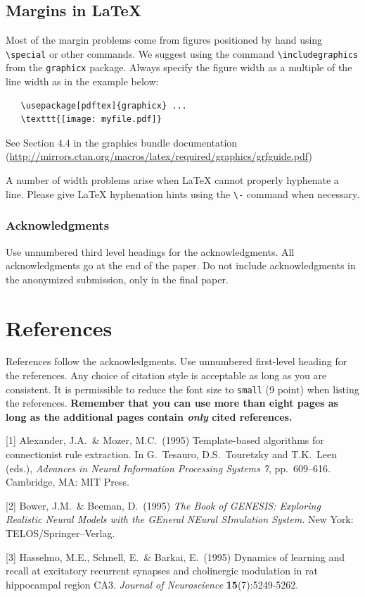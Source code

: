 \documentclass{article}
\begin{document}
\subsection{Margins in \LaTeX{}}

Most of the margin problems come from figures positioned by hand using
\verb+\special+ or other commands. We suggest using the command
\verb+\includegraphics+ from the \verb+graphicx+ package. Always specify the
figure width as a multiple of the line width as in the example below:
\begin{verbatim}
   \usepackage[pdftex]{graphicx} ...
   \texttt{[image: myfile.pdf]}
\end{verbatim}
See Section 4.4 in the graphics bundle documentation
(\url{http://mirrors.ctan.org/macros/latex/required/graphics/grfguide.pdf})

A number of width problems arise when \LaTeX{} cannot properly hyphenate a
line. Please give LaTeX hyphenation hints using the \verb+\-+ command when
necessary.

\subsubsection*{Acknowledgments}

Use unnumbered third level headings for the acknowledgments. All acknowledgments
go at the end of the paper. Do not include acknowledgments in the anonymized
submission, only in the final paper.

\section*{References}

References follow the acknowledgments. Use unnumbered first-level heading for
the references. Any choice of citation style is acceptable as long as you are
consistent. It is permissible to reduce the font size to \verb+small+ (9 point)
when listing the references. {\bf Remember that you can use more than eight
  pages as long as the additional pages contain \emph{only} cited references.}
\medskip

\small

[1] Alexander, J.A.\ \& Mozer, M.C.\ (1995) Template-based algorithms for
connectionist rule extraction. In G.\ Tesauro, D.S.\ Touretzky and T.K.\ Leen
(eds.), {\it Advances in Neural Information Processing Systems 7},
pp.\ 609--616. Cambridge, MA: MIT Press.

[2] Bower, J.M.\ \& Beeman, D.\ (1995) {\it The Book of GENESIS: Exploring
  Realistic Neural Models with the GEneral NEural SImulation System.}  New York:
TELOS/Springer--Verlag.

[3] Hasselmo, M.E., Schnell, E.\ \& Barkai, E.\ (1995) Dynamics of learning and
recall at excitatory recurrent synapses and cholinergic modulation in rat
hippocampal region CA3. {\it Journal of Neuroscience} {\bf 15}(7):5249-5262.
\end{document}
